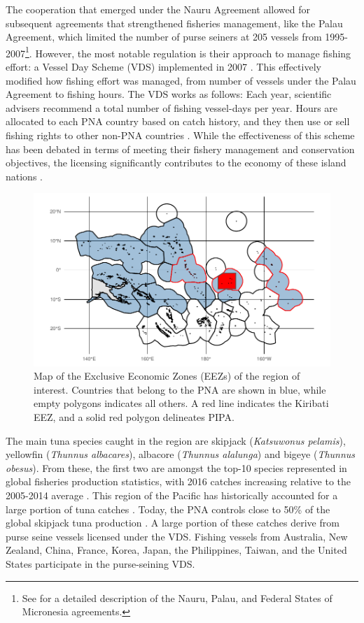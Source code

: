 \documentclass[11pt,english]{article}
\begin{document}
The cooperation that emerged under the Nauru Agreement allowed for subsequent
agreements that strengthened fisheries management, like the Palau
Agreement, which limited the number of purse seiners at 205 vessels from
1995-2007\footnote{See \citet{havice_2010} for a detailed description of
  the Nauru, Palau, and Federal States of Micronesia agreements.}. However, the most notable regulation is
their approach to manage fishing effort: a Vessel Day Scheme (VDS)
implemented in 2007 \citep{havice_2013}. This effectively modified how
fishing effort was managed, from number of vessels under the Palau
Agreement to fishing hours. The VDS works as follows: Each year,
scientific advisers recommend a total number of fishing vessel-days per
year. Hours are allocated to each PNA country based on catch history,
and they then use or sell fishing rights to other non-PNA countries
\citep{aqorau_2018}. While the effectiveness of this scheme has been
debated in terms of meeting their fishery management and conservation
objectives, the licensing significantly contributes to the economy of
these island nations \citep{havice_2010}.

\begin{figure}
\centering
\includegraphics{img/PNA_map.pdf}
\caption{\label{fig:PNA_map}Map of the Exclusive
Economic Zones (EEZs) of the region of interest. Countries that belong
to the PNA are shown in blue, while empty polygons indicates all others.
A red line indicates the Kiribati EEZ, and a solid red polygon
delineates PIPA.}
\end{figure}

The main tuna species caught in the region are skipjack
(\emph{Katsuwonus pelamis}), yellowfin (\emph{Thunnus albacares}),
albacore (\emph{Thunnus alalunga}) and bigeye (\emph{Thunnus obesus}).
From these, the first two are amongst the top-10 species represented in
global fisheries production statistics, with 2016 catches increasing
relative to the 2005-2014 average \citep{fao_2018}. This region of the
Pacific has historically accounted for a large portion of tuna catches
\citep{aqorau_1997}. Today, the PNA controls close to 50\% of the global
skipjack tuna production \citep{pna_website_2018}. A large portion of
these catches derive from purse seine vessels licensed under the VDS.
Fishing vessels from Australia, New Zealand, China, France, Korea,
Japan, the Philippines, Taiwan, and the United States participate in the
purse-seining VDS.
\end{document}
